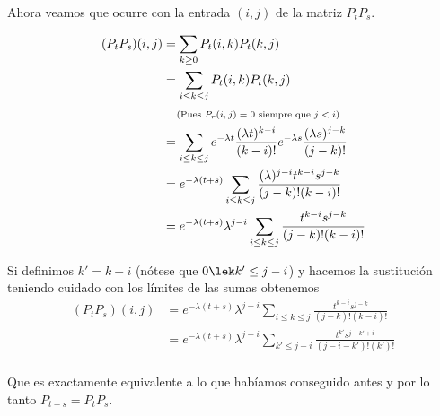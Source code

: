 Ahora veamos que ocurre con la entrada $(i,j)$ de la matriz $P_t P_s$.

\begin{align}
    (P_t P_s)(i,j)      &=  \sum_{k \geq 0}         P_t(i,k) P_t(k,j)                                                                                       \\
                        &=  \sum_{i \leq k \leq j}  P_t(i,k) P_t(k,j)                                                                                       \\
                        &\;\;\;\;\mbox{{\scriptsize(Pues $P_r(i,j) = 0$ siempre que $j < i$)}}                                                                                  \\
                        &= \sum_{i \leq k \leq j}  e^{-\lambda t} \frac{(\lambda t)^{k- i}}{(k - i)!} e^{-\lambda s} \frac{(\lambda s)^{j - k}}{(j - k)!}   \\
                        &= e^{-\lambda (t+s)}\sum_{i \leq k \leq j}   \frac{(\lambda)^{j - i} t^{k-i} s^{j-k}}{(j - k)!(k - i)!}                            \\
                        &= e^{-\lambda (t+s)} \lambda^{j - i} \sum_{i \leq k \leq j}   \frac{ t^{k-i} s^{j-k}}{(j - k)!(k - i)!}                            \\
\end{align}

Si definimos $k' = k - i$ (nótese que $0 \lek k' \leq j - i$) y hacemos la sustitución teniendo cuidado con los límites de las sumas obtenemos
\begin{align}
    (P_t P_s)(i,j)      &=  e^{-\lambda (t+s)} \lambda^{j - i} \sum_{i \leq k \leq j}   \frac{ t^{k-i} s^{j-k}}{(j - k)!(k - i)!}                              \\
                        &=  e^{-\lambda (t+s)} \lambda^{j - i} \sum_{k' \leq j - i}   \frac{ t^{k'} s^{j-k'+i}}{(j - i - k')!(k')!}                            \\
\end{align}\pn

Que es exactamente equivalente a lo que habíamos conseguido antes y por lo tanto $P_{t+s} = P_t P_s$.
